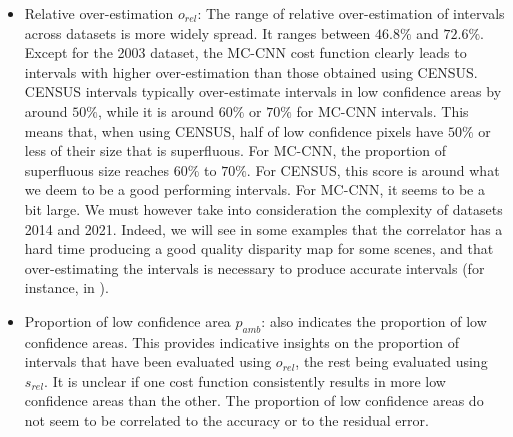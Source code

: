 \begin{itemize}
    \item Relative over-estimation $o_{rel}$: The range of relative over-estimation of intervals across datasets is more widely spread. It ranges between $46.8\%$ and $72.6\%$. Except for the 2003 dataset, the MC-CNN cost function clearly leads to intervals with higher over-estimation than those obtained using CENSUS. CENSUS intervals typically over-estimate intervals in low confidence areas by around $50\%$, while it is around $60\%$ or $70\%$ for MC-CNN intervals. This means that, when using CENSUS, half of low confidence pixels have $50\%$ or less of their size that is superfluous. For MC-CNN, the proportion of superfluous size reaches $60\%$ to $70\%$. For CENSUS, this score is around what we deem to be a good performing intervals. For MC-CNN, it seems to be a bit large. We must however take into consideration the complexity of datasets 2014 and 2021. Indeed, we will see in some examples that the correlator has a hard time producing a good quality disparity map for some scenes, and that over-estimating the intervals is necessary to produce accurate intervals (for instance, in ).
    
    \item Proportion of low confidence area $p_{amb}$:  also indicates the proportion of low confidence areas. This provides indicative insights on the proportion of intervals that have been evaluated using $o_{rel}$, the rest being evaluated using $s_{rel}$. It is unclear if one cost function consistently results in more low confidence areas than the other. The proportion of low confidence areas do not seem to be correlated to the accuracy or to the residual error.
\end{itemize}

